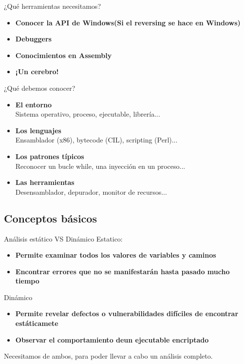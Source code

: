 \documentclass{beamer}
\begin{document}
\begin{frame}{¿Qué herramientas necesitamos?}
\begin{itemize}
\item \textbf{Conocer la API de Windows(Si el reversing se hace en Windows)}
\item \textbf{Debuggers}
\item \textbf{Conocimientos en Assembly}
\item \textbf{¡Un cerebro!}
\end{itemize}

\end{frame}

\begin{frame}{¿Qué debemos conocer?}
\begin{itemize}
\item \textbf{El entorno} \\ \hspace{4ex}Sistema operativo, proceso, ejecutable, librería...
\item \textbf{Los lenguajes} \\ \hspace{4ex}Ensamblador (x86), bytecode (CIL), scripting (Perl)...
\item \textbf{Los patrones típicos} \\ \hspace{4ex}Reconocer un bucle while, una inyección en un proceso...
\item \textbf{Las herramientas} \\ \hspace{4ex}Desensamblador, depurador, monitor de recursos...
\end{itemize}

\end{frame}



\subsection{Conceptos básicos}

\begin{frame}{Análisis estático VS Dinámico}
Estatico:
\begin{itemize}
	\item \textbf{Permite examinar todos los valores de variables y caminos}
	\item \textbf{Encontrar errores que no se manifestarán hasta pasado mucho tiempo}
\end{itemize}
Dinámico
\begin{itemize}
	\item \textbf{Permite revelar defectos o vulnerabilidades difíciles de encontrar estáticamete}
	\item \textbf{Observar el comportamiento deun ejecutable encriptado}
\end{itemize}
Necesitamos de ambos, para poder llevar a cabo un análisis completo.


\end{frame}
\end{document}
